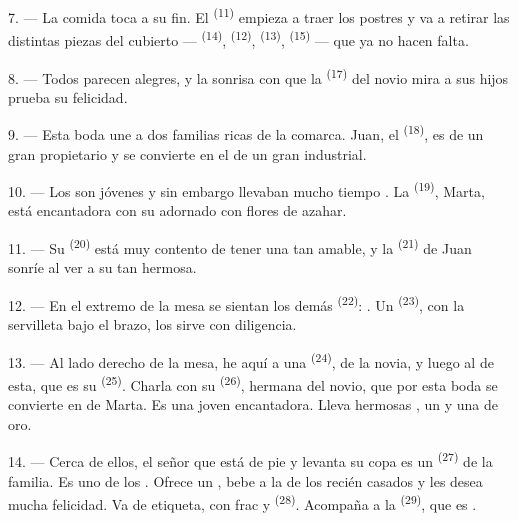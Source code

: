 7. --- La comida toca a su fin. El  \textsuperscript{(11)} empieza a
traer los postres y va a retirar las distintas piezas del cubierto ---
 \textsuperscript{(14)},  \textsuperscript{(12)},
 \textsuperscript{(13)},  \textsuperscript{(15)} --- que ya
no hacen falta.

\VUsaut{3.0mm}

8. --- Todos parecen alegres, y la sonrisa con que la 
\textsuperscript{(17)} del novio mira a sus hijos prueba su felicidad.

9. --- Esta boda une a dos familias ricas de la comarca. Juan, el
 \textsuperscript{(18)}, es  de un gran propietario y se
convierte en el  de un gran industrial.

10. --- Los  son jóvenes y sin embargo llevaban mucho tiempo
. La  \textsuperscript{(19)}, Marta, está
encantadora con su  adornado con flores de azahar.

11. --- Su  \textsuperscript{(20)} está muy contento de tener una
 tan amable, y la  \textsuperscript{(21)} de Juan sonríe
al ver a su  tan hermosa.

12. --- En el extremo de la mesa se sientan los demás 
\textsuperscript{(22)}: . Un
 \textsuperscript{(23)}, con la servilleta bajo el brazo, los sirve
con diligencia.

\VUsaut{3.0mm}

13. --- Al lado derecho de la mesa, he aquí a una 
\textsuperscript{(24)},  de la novia, y luego al  de
esta, que es su  \textsuperscript{(25)}. Charla con su
 \textsuperscript{(26)}, hermana del novio, que por esta boda
se convierte en  de Marta. Es una joven encantadora. Lleva
hermosas , un  y una  de
oro.

14. --- Cerca de ellos, el señor que está de pie y levanta su copa es un
 \textsuperscript{(27)} de la familia. Es uno de los
. Ofrece un , bebe a la
 de los recién casados y les desea mucha felicidad. Va de
etiqueta, con frac y  \textsuperscript{(28)}. Acompaña a
la  \textsuperscript{(29)}, que es .

